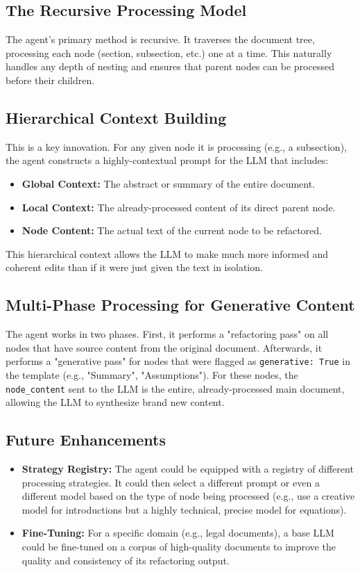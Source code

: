 \documentclass{article}
\begin{document}
\subsection{The Recursive Processing Model}
The agent's primary method is recursive. It traverses the document tree, processing each node (section, subsection, etc.) one at a time. This naturally handles any depth of nesting and ensures that parent nodes can be processed before their children.

\subsection{Hierarchical Context Building}
This is a key innovation. For any given node it is processing (e.g., a subsection), the agent constructs a highly-contextual prompt for the LLM that includes:
\begin{itemize}
    \item \textbf{Global Context:} The abstract or summary of the entire document.
    \item \textbf{Local Context:} The already-processed content of its direct parent node.
    \item \textbf{Node Content:} The actual text of the current node to be refactored.
\end{itemize}
This hierarchical context allows the LLM to make much more informed and coherent edits than if it were just given the text in isolation.

\subsection{Multi-Phase Processing for Generative Content}
The agent works in two phases. First, it performs a "refactoring pass" on all nodes that have source content from the original document. Afterwards, it performs a "generative pass" for nodes that were flagged as \texttt{generative: True} in the template (e.g., "Summary", "Assumptions"). For these nodes, the \texttt{node\_content} sent to the LLM is the entire, already-processed main document, allowing the LLM to synthesize brand new content.

\subsection{Future Enhancements}
\begin{itemize}
    \item \textbf{Strategy Registry:} The agent could be equipped with a registry of different processing strategies. It could then select a different prompt or even a different model based on the type of node being processed (e.g., use a creative model for introductions but a highly technical, precise model for equations).
    \item \textbf{Fine-Tuning:} For a specific domain (e.g., legal documents), a base LLM could be fine-tuned on a corpus of high-quality documents to improve the quality and consistency of its refactoring output.
\end{itemize}
\end{document}
